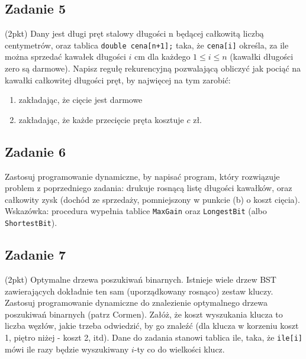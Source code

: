\documentclass{article}
\begin{document}
\subsection*{Zadanie 5}
(2pkt) Dany jest długi pręt stalowy długości n będącej całkowitą liczbą centymetrów,
oraz tablica \verb|double cena[n+1];| taka, że \verb|cena[i]| określa, za ile można sprzedać kawałek długości $i$
cm dla każdego $1 \leq i \leq n$ (kawałki długości zero są darmowe). Napisz
regułę rekurencyjną pozwalającą obliczyć jak pociąć na kawałki całkowitej długości pręt,
by najwięcej na tym zarobić:
\begin{enumerate}[label=(\alph*)]
    \item zakładając, że cięcie jest darmowe
    \item zakładając, że każde przecięcie pręta kosztuje $c$ zł.
\end{enumerate}

\subsection*{Zadanie 6}
Zastosuj programowanie dynamiczne, by napisać program, który rozwiązuje problem
z poprzedniego zadania: drukuje rosnącą listę długości kawałków, oraz całkowity zysk
(dochód ze sprzedaży, pomniejszony w punkcie (b) o koszt cięcia).
Wskazówka: procedura wypełnia tablice \verb|MaxGain| oraz \verb|LongestBit| (albo \verb|ShortestBit|).

\subsection*{Zadanie 7}
(2pkt) Optymalne drzewa poszukiwań binarnych. Istnieje wiele drzew BST zawierających
dokładnie ten sam (uporządkowany rosnąco) zestaw kluczy. Zastosuj programowanie
dynamiczne do znalezienie optymalnego drzewa poszukiwań binarnych (patrz Cormen).
Załóż, że koszt wyszukania klucza to liczba węzłów, jakie trzeba odwiedzić, by go
znaleźć (dla klucza w korzeniu koszt 1, piętro niżej - koszt 2, itd). Dane do zadania stanowi
tablica ile, taka, że \verb|ile[i]| mówi ile razy będzie wyszukiwany $i$-ty co do wielkości klucz.
\end{document}
